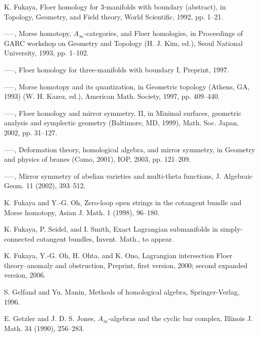 \begin{list}{}{\setlength{\leftmargin}{3em}\setlength{\labelwidth}{2.5em}\setlength{\itemsep}{.5em}\small}
\item[\hypertarget{bib:51}{[51]}] K. Fukaya, Floer homology for 3-manifolds with boundary (abstract), in Topology, Geometry, and Field theory, World Scientific, 1992, pp. 1–21. 
\item[\hypertarget{bib:52}{[52]}] —–, Morse homotopy, $A_\infty$-categories, and Floer homologies, in Proceedings of GARC workshop on Geometry and Topology (H. J. Kim, ed.), Seoul National University, 1993, pp. 1–102. 
\item[\hypertarget{bib:53}{[53]}] —–, Floer homology for three-manifolds with boundary I, Preprint, 1997. 
\item[\hypertarget{bib:54}{[54]}] —–, Morse homotopy and its quantization, in Geometric topology (Athens, GA, 1993) (W. H. Kazez, ed.), American Math. Society, 1997, pp. 409–440. 
\item[\hypertarget{bib:55}{[55]}] —–, Floer homology and mirror symmetry. II, in Minimal surfaces, geometric analysis and symplectic geometry (Baltimore, MD, 1999), Math. Soc. Japan, 2002, pp. 31–127. 
\item[\hypertarget{bib:56}{[56]}] —–, Deformation theory, homological algebra, and mirror symmetry, in Geometry and physics of branes (Como, 2001), IOP, 2003, pp. 121–209. 
\item[\hypertarget{bib:57}{[57]}] —–, Mirror symmetry of abelian varieties and multi-theta functions, J. Algebraic Geom. 11 (2002), 393–512. 
\item[\hypertarget{bib:58}{[58]}] K. Fukaya and Y.-G. Oh, Zero-loop open strings in the cotangent bundle and Morse homotopy, Asian J. Math. 1 (1998), 96–180. 
\item[\hypertarget{bib:59}{[59]}] K. Fukaya, P. Seidel, and I. Smith, Exact Lagrangian submanifolds in simply-connected cotangent bundles, Invent. Math., to appear. 
\item[\hypertarget{bib:60}{[60]}] K. Fukaya, Y.-G. Oh, H. Ohta, and K. Ono, Lagrangian intersection Floer theory–anomaly and obstruction, Preprint, first version, 2000; second expanded version, 2006. 
\item[\hypertarget{bib:61}{[61]}] S. Gelfand and Yu. Manin, Methods of homological algebra, Springer-Verlag, 1996. 
\item[\hypertarget{bib:62}{[62]}] E. Getzler and J. D. S. Jones, $A_\infty$-algebras and the cyclic bar complex, Illinois J. Math. 34 (1990), 256–283. 

\end{list}

